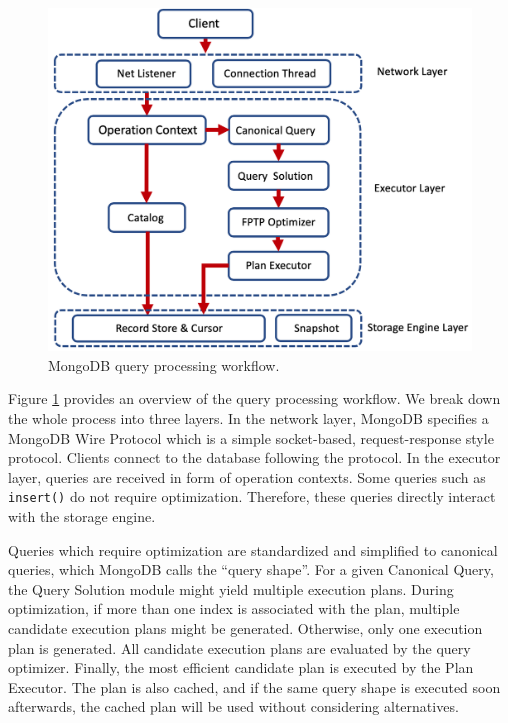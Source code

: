 \begin{figure}[htb]
  \centering
  \includegraphics[width=0.9\linewidth]{images/body/overview.png}
  \caption{MongoDB query processing workflow.}
  \label{fig:workflow}
\end{figure}

Figure \ref{fig:workflow} provides an overview of the query processing workflow. We break down the 
whole process into three layers. In the network layer, MongoDB specifies a MongoDB Wire 
Protocol which is a simple socket-based, request-response style protocol. Clients connect 
to the database following the protocol. In the executor layer, queries are received in form of 
operation contexts. Some queries such as \verb|insert()| do not require optimization. Therefore, these queries directly interact with the storage engine.

Queries which require optimization are standardized and simplified to canonical queries, which MongoDB calls the ``query shape''. For a given Canonical Query, the Query Solution module might yield multiple execution plans. During optimization, if more than one index is associated with the plan, multiple candidate execution plans might be generated. Otherwise, only one execution plan is generated. All candidate execution plans are evaluated by the \approachName query optimizer. Finally, the most efficient candidate plan is executed by the Plan Executor.  The plan is also cached, and if the same query shape is executed soon afterwards, the cached plan will be used without considering alternatives.


